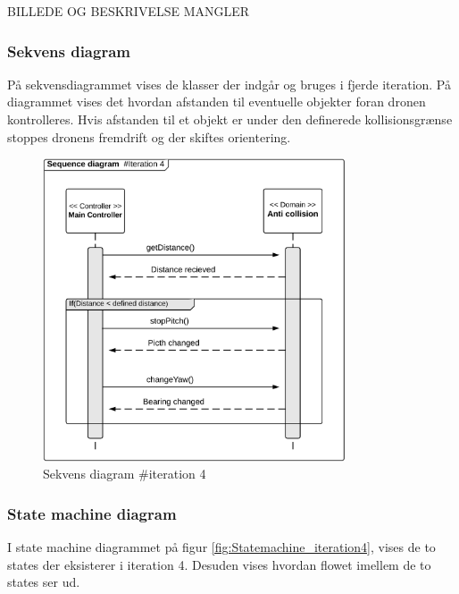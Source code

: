BILLEDE OG BESKRIVELSE MANGLER


\newpage
\subsubsection*{Sekvens diagram}
\vspace{-0.2cm}
På sekvensdiagrammet vises de klasser der indgår og bruges i fjerde iteration. 
På diagrammet vises det hvordan afstanden til eventuelle objekter foran dronen kontrolleres. Hvis afstanden til et objekt er under den definerede kollisionsgrænse stoppes dronens fremdrift og der skiftes orientering. 


\begin{figure}[H]
	\centering
	\includegraphics[width=0.8\textwidth]{Billeder/sekvens/sekvens_iteration4}
	\caption{Sekvens diagram \#iteration 4}
	\label{fig:Sekvens_diagram_iteration4}
\end{figure}



\subsubsection*{State machine diagram}
\vspace{-0.2cm}

I state machine diagrammet på figur \ref{fig:Statemachine_iteration4}, vises de to states der eksisterer i iteration 4. Desuden vises hvordan flowet imellem de to states ser ud.


